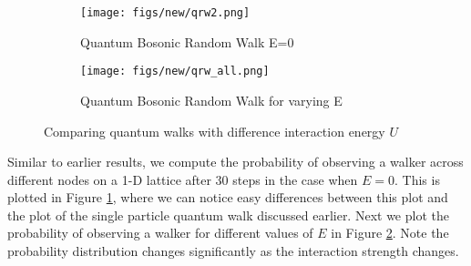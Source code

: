 \documentclass{article}
\begin{document}
\begin{figure*}
    \centering
    \begin{subfigure}{0.45\linewidth}
    \texttt{[image: figs/new/qrw2.png]}
    \caption{Quantum Bosonic Random Walk E=0  \label{fig:qwb} }
    \end{subfigure}\qquad
    \begin{subfigure}{0.45\linewidth}
    \texttt{[image: figs/new/qrw\_all.png]}
    \caption{Quantum Bosonic Random Walk for varying E \label{fig:qwbr} }
    \end{subfigure}
    \caption{Comparing quantum walks with difference interaction energy $U$ \label{fig:qwb2}}
\end{figure*}


Similar to earlier results, we compute the probability of observing a walker across different nodes on a 1-D lattice after 30 steps in the case when $E=0$. This is plotted in Figure \ref{fig:qwb}, where we can notice easy differences between this plot and the plot of the single particle quantum walk discussed earlier. Next we plot the probability of observing a walker for different values of $E$ in Figure \ref{fig:qwbr}. Note the probability distribution changes significantly as the interaction strength changes. %




\end{document}
